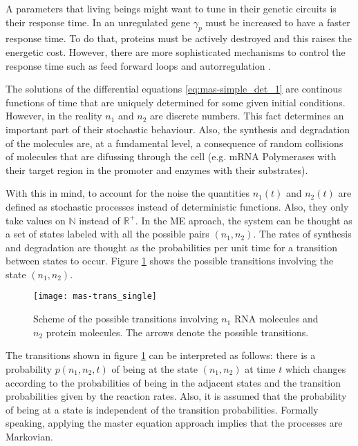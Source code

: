 A parameters that living beings might want to tune in their genetic circuits is their response time. In an unregulated gene $\gamma_p$ must be increased to have a faster response time. To do that, proteins must be actively destroyed and this raises the energetic cost. However, there are more sophisticated mechanisms to control the response time such as feed forward loops and autorregulation \cite{alon06}.

The solutions of the differential equations \eqref{eq:mas-simple_det_1} are continous functions of time that are uniquely determined for some given initial conditions. However, in the reality $n_1$ and $n_2$ are discrete numbers. This fact determines an important part of their stochastic behaviour. Also, the synthesis and degradation of the molecules are, at a fundamental level, a consequence of random collisions of molecules that are difussing through the cell (e.g. mRNA Polymerases with their target region in the promoter and enzymes with their substrates).

With this in mind, to account for the noise the quantities $n_1(t)$ and $n_2(t)$ are defined as stochastic processes instead of deterministic functions. Also, they only take values on $\mathbb{N}$ instead of $\mathbb{R}^+$. In the ME aproach, the system can be thought as a set of states labeled with all the possible pairs $(n_1,n_2)$. The rates of synthesis and degradation are thought as the probabilities per unit time for a transition between states to occur. Figure \ref{fig:mas-trans_single} shows the possible transitions involving the state $(n_1,n_2)$.

\begin{figure}[H]
  \centering
  \texttt{[image: mas-trans\_single]}
  \caption[Transitions between states for a single gene]{\label{fig:mas-trans_single} Scheme of the possible transitions involving $n_1$ RNA molecules and $n_2$ protein molecules. The arrows denote the possible transitions.}
\end{figure}

The transitions shown in figure \ref{fig:mas-trans_single} can be interpreted as follows: there is a probability $p(n_1,n_2,t)$ of being at the state $(n_1,n_2)$ at time $t$ which changes according to the probabilities of being in the adjacent states and the transition probabilities given by the reaction rates. Also, it is assumed that the probability of being at a state is independent of the transition probabilities. Formally speaking, applying the master equation approach implies that the processes are Markovian.

